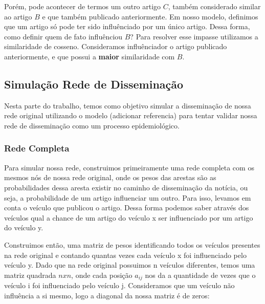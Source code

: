 \documentclass[a4paper,12pt]{article}
\begin{document}
\begin{description}
    Porém, pode acontecer de termos um outro artigo $C$, também considerado similar ao artigo $B$ e que também publicado anteriormente. Em nosso modelo,
    definimos que um artigo só pode ter sido influênciado por um único artigo. Dessa forma, como definir quem de fato influênciou $B$? Para
    resolver esse impasse utilizamos a similaridade de cosseno. Consideramos influênciador o artigo publicado anteriormente, e que possui
    a \textbf{maior} similaridade com $B$.
    
    
 \end{description}
 

\subsection{Simulação Rede de Disseminação}

Nesta parte do trabalho, temos como objetivo simular a disseminação de nossa rede original utilizando o modelo (adicionar referencia)
para tentar validar nossa rede de disseminação como um processo epidemiológico.

\subsubsection{Rede Completa}

 Para simular nossa rede, construimos primeiramente uma rede completa com os mesmos nós de nossa rede original, onde os pesos das arestas
 são as probabilidades dessa aresta existir no caminho de disseminação da notícia, ou seja, a probabilidade de um artigo influenciar um 
 outro. Para isso, levamos em conta o veículo que publicou o artigo. Dessa forma podemos saber 
 através dos veículos qual a chance de um artigo do veículo x ser influenciado por um artigo do veículo y.

 Construimos então, uma matriz de pesos identificando todos os veículos presentes na rede original e contando quantas vezes
 cada veículo x foi influenciado pelo veículo y. Dado que na rede original possuimos n
 veículos diferentes, temos uma matriz quadrada $nxn$, onde cada posição $a_{ij}$ nos da a quantidade de vezes que o veículo i foi influenciado
 pelo veículo j. Consideramos que um veículo não influência a si mesmo, logo a diagonal da nossa matriz é de zeros:
 \pagebreak
 
\end{document}
